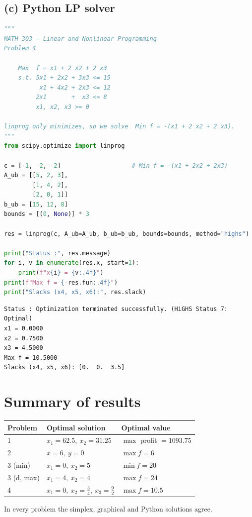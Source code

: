 \documentclass[11pt,a4paper]{article}
\begin{document}
\subsection*{(c) Python LP solver}
\begin{lstlisting}[language=Python]
"""
MATH 303 - Linear and Nonlinear Programming
Problem 4

    Max  f = x1 + 2 x2 + 2 x3
    s.t. 5x1 + 2x2 + 3x3 <= 15
          x1 + 4x2 + 2x3 <= 12
         2x1       +  x3 <= 8
         x1, x2, x3 >= 0

linprog only minimizes, so we solve  Min f = -(x1 + 2 x2 + 2 x3).
"""
from scipy.optimize import linprog

c = [-1, -2, -2]                    # Min f = -(x1 + 2x2 + 2x3)
A_ub = [[5, 2, 3],
        [1, 4, 2],
        [2, 0, 1]]
b_ub = [15, 12, 8]
bounds = [(0, None)] * 3

res = linprog(c, A_ub=A_ub, b_ub=b_ub, bounds=bounds, method="highs")

print("Status :", res.message)
for i, v in enumerate(res.x, start=1):
    print(f"x{i} = {v:.4f}")
print(f"Max f = {-res.fun:.4f}")
print("Slacks (x4, x5, x6):", res.slack)
\end{lstlisting}
\begin{lstlisting}[style=out]
Status : Optimization terminated successfully. (HiGHS Status 7: Optimal)
x1 = 0.0000
x2 = 0.7500
x3 = 4.5000
Max f = 10.5000
Slacks (x4, x5, x6): [0.  0.  3.5]
\end{lstlisting}

\section*{Summary of results}
\begin{center}\renewcommand{\arraystretch}{1.3}
\begin{tabular}{lll}
\toprule
Problem & Optimal solution & Optimal value\\
\midrule
1 & $x_1=62.5,\ x_2=31.25$ & $\max$ profit $=1093.75$\\
2 & $x=6,\ y=0$ & $\max f=6$\\
3 (min) & $x_1=0,\ x_2=5$ & $\min f=20$\\
3 (d, max) & $x_1=4,\ x_2=4$ & $\max f=24$\\
4 & $x_1=0,\ x_2=\tfrac34,\ x_3=\tfrac92$ & $\max f=10.5$\\
\bottomrule
\end{tabular}\end{center}
In every problem the simplex, graphical and Python solutions agree.
\end{document}
